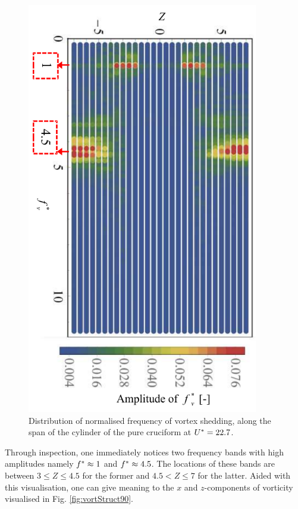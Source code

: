 \documentclass[oneside]{utmthesis}
\begin{document}
\begin{figure}[H]
  \centering
\includegraphics[angle=90,width=0.9\textwidth]{figs/probe90YU10}
\caption{Distribution of normalised frequency of vortex shedding, along the span of the cylinder of the pure cruciform at $U^{*} = 22.7$.}
  \label{fig:probe90YU10}
\end{figure}

Through inspection, one immediately notices two frequency bands with high amplitudes namely $f^{*} \approx 1$ and $f^{*} \approx 4.5$. The locations of these bands are between $3 \leq Z \leq 4.5$ for the former and $4.5 < Z \leq 7$ for the latter. Aided with this visualisation, one can give meaning to the $x$ and $z$-components of vorticity visualised in Fig. \ref{fig:vortStruct90}.
\end{document}
